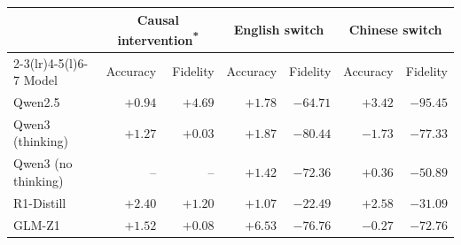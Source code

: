 \begin{tabular}{@{}lrrrrrr@{}}
\toprule
& \multicolumn{2}{c}{Causal intervention\textsuperscript{*}} &
  \multicolumn{2}{c}{English switch} & \multicolumn{2}{c}{Chinese switch} \\
\cmidrule(lr){2-3}\cmidrule(lr){4-5}\cmidrule(l){6-7}
Model & Accuracy & Fidelity & Accuracy & Fidelity & Accuracy & Fidelity \\
\midrule
Qwen2.5 & $+0.94$ & $+4.69$ & $+1.78$ & $-64.71$ & $+3.42$ & $-95.45$ \\
Qwen3 (thinking) & $+1.27$ & $+0.03$ & $+1.87$ & $-80.44$ & $-1.73$ & $-77.33$ \\
Qwen3 (no thinking) & -- & -- & $+1.42$ & $-72.36$ & $+0.36$ & $-50.89$ \\
R1-Distill & $+2.40$ & $+1.20$ & $+1.07$ & $-22.49$ & $+2.58$ & $-31.09$ \\
GLM-Z1 & $+1.52$ & $+0.08$ & $+6.53$ & $-76.76$ & $-0.27$ & $-72.76$ \\
\bottomrule
\end{tabular}
